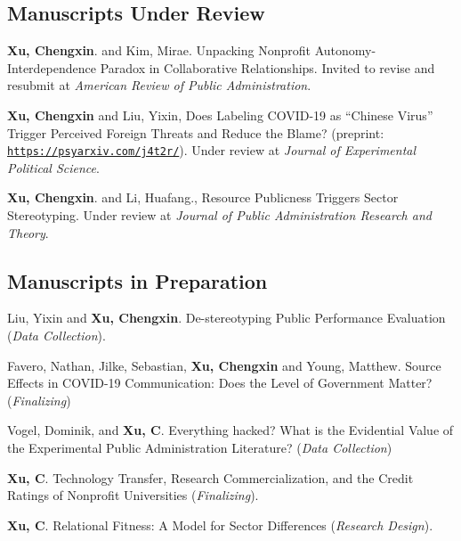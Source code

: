 \documentclass[letterpaper]{article}
\renewenvironment{itemize}{
  \begin{list}{}{
    \setlength{\leftmargin}{1.5em}
  }
}{
  \end{list}
}
\begin{document}
\subsection*{Manuscripts Under Review}
\begin{itemize}

\item \textbf{Xu, Chengxin}. and Kim, Mirae. Unpacking Nonprofit Autonomy-Interdependence Paradox in Collaborative Relationships. Invited to revise and resubmit at {\it American Review of Public Administration}.

\item \textbf{Xu, Chengxin} and Liu, Yixin, Does Labeling COVID-19 as “Chinese Virus” Trigger Perceived Foreign Threats and
Reduce the Blame? (preprint: \href{https://psyarxiv.com/j4t2r/}{\tt https://psyarxiv.com/j4t2r/}). Under review at {\it Journal of Experimental Political Science}.

\item \textbf{Xu, Chengxin}. and Li, Huafang., Resource Publicness Triggers Sector Stereotyping. Under review at {\it Journal of Public Administration Research and Theory}.

\end{itemize}


\subsection*{Manuscripts in Preparation}
\begin{itemize}

\item Liu, Yixin and \textbf{Xu, Chengxin}. De-stereotyping Public Performance Evaluation ({\it Data Collection}).

\item Favero, Nathan, Jilke, Sebastian, \textbf{Xu, Chengxin} and Young, Matthew. Source Effects in COVID-19 Communication: Does the Level of Government Matter? ({\it Finalizing})

\item Vogel, Dominik, and \textbf{Xu, C}. Everything hacked? What is the Evidential Value of the Experimental Public Administration Literature? ({\it Data Collection})

\item \textbf{Xu, C}. Technology Transfer, Research Commercialization, and the Credit Ratings of Nonprofit Universities ({\it Finalizing}).

\item \textbf{Xu, C}. Relational Fitness: A Model for Sector Differences ({\it Research Design}).

\end{itemize}
\end{document}
